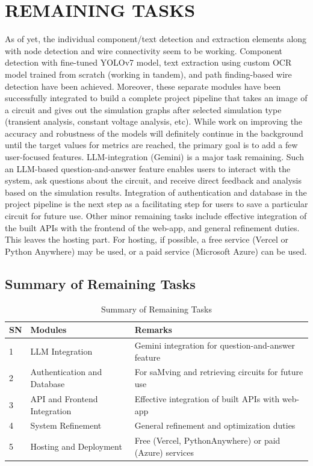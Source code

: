 \chapter{REMAINING TASKS}

As of yet, the individual component/text detection and extraction elements along with node detection and wire connectivity seem to be working. Component detection with fine-tuned YOLOv7 model, text extraction using custom OCR model trained from scratch (working in tandem), and path finding-based wire detection have been achieved. Moreover, these separate modules have been successfully integrated to build a complete project pipeline that takes an image of a circuit and gives out the simulation graphs after selected simulation type (transient analysis, constant voltage analysis, etc). While work on improving the accuracy and robustness of the models will definitely continue in the background until the target values for metrics are reached, the primary goal is to add a few user-focused features. LLM-integration (Gemini) is a major task remaining. Such an LLM-based question-and-answer feature enables users to interact with the system, ask questions about the circuit, and receive direct feedback and analysis based on the simulation results. Integration of authentication and database in the project pipeline is the next step as a facilitating step for users to save a particular circuit for future use. Other minor remaining tasks include effective integration of the built APIs with the frontend of the web-app, and general refinement duties. This leaves the hosting part. For hosting, if possible, a free service (Vercel or Python Anywhere) may be used, or a paid service (Microsoft Azure) can be used.

\section{Summary of Remaining Tasks}

\begin{table}[H]
    \centering
    \small
    \caption{Summary of Remaining Tasks}
    \begin{tabular}{lll}
        \toprule
        \textbf{SN} & \textbf{Modules} & \textbf{Remarks} \\
        \midrule
        1 & LLM Integration & Gemini integration for question-and-answer feature \\
        2 & Authentication and Database & For saMving and retrieving circuits for future use \\
        3 & API and Frontend Integration & Effective integration of built APIs with web-app \\
        4 & System Refinement & General refinement and optimization duties \\
        5 & Hosting and Deployment & Free (Vercel, PythonAnywhere) or paid (Azure) services \\
        \bottomrule
    \end{tabular}
    \label{tab:remaining-tasks-summary}
\end{table}


